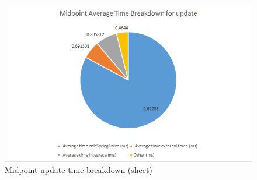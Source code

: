     \begin{figure}
    \begin{center}
      \includegraphics[scale=.9]{Figures/sheet_m_ut}
    \end{center}
    \caption{Midpoint update time breakdown (sheet)}
    \label{fig:m ut sheet}
  \end{figure}

